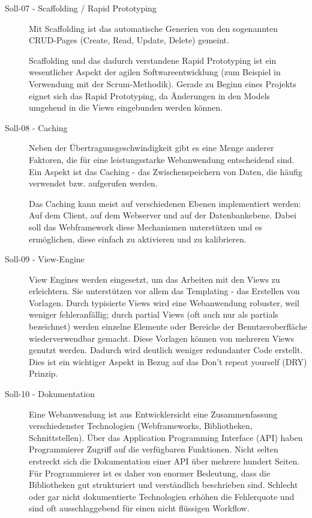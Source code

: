 \begin{description}
    \item[Soll-07 - Scaffolding / Rapid Prototyping\label{itm:Soll-07}]

    Mit Scaffolding ist das automatische Generien von den sogenannten CRUD-Pages
    (Create, Read, Update, Delete) gemeint.

    Scaffolding und das dadurch verstandene Rapid Prototyping ist ein
    wesentlicher Aspekt der agilen Softwareentwicklung (zum Beispiel in
    Verwendung mit der Scrum-Methodik). Gerade zu Beginn eines Projekts eignet
    sich das Rapid Prototyping, da Änderungen in den Models umgehend in die
    Views eingebunden werden können.

    \item[Soll-08 - Caching\label{itm:Soll-08}]

    Neben der Übertragunsgeschwindigkeit gibt es eine Menge anderer Faktoren,
    die für eine leistungsstarke Webanwendung entscheidend sind. Ein Aspekt ist
    das Caching - das Zwischenspeichern von Daten, die häufig verwendet bzw.
    aufgerufen werden.

    Das Caching kann meist auf verschiedenen Ebenen implementiert werden: Auf
    dem Client, auf dem Webserver und auf der Datenbankebene. Dabei soll das
    Webframework diese Mechanismen unterstützen und es ermöglichen, diese
    einfach zu aktivieren und zu kalibrieren.  

    \item[Soll-09 - View-Engine\label{itm:Soll-09}]

    View Engines werden eingesetzt, um das Arbeiten mit den Views zu
    erleichtern. Sie unterstützen vor allem das Templating - das Erstellen von
    Vorlagen. Durch typisierte Views wird eine Webanwendung robuster, weil
    weniger fehleranfällig; durch partial Views (oft auch nur als partials
    bezeichnet) werden einzelne Elemente oder Bereiche der Benutzeroberfläche
    wiederverwendbar gemacht. Diese Vorlagen können von mehreren Views genutzt
    werden. Dadurch wird deutlich weniger redundanter Code erstellt. Dies ist
    ein wichtiger Aspekt in Bezug auf das Don’t repeat yourself (DRY) Prinzip.

    \item[Soll-10 - Dokumentation\label{itm:Soll-10}]

    Eine Webanwendung ist aus Entwicklersicht eine Zusammenfassung
    verschiedenster Technologien (Webframeworks, Bibliotheken, Schnittstellen).
    Über das Application Programming Interface (API) haben Programmierer Zugriff
    auf die verfügbaren Funktionen. Nicht selten erstreckt sich die
    Dokumentation einer API über mehrere hundert Seiten. Für Programmierer ist
    es daher von enormer Bedeutung, dass die Bibliotheken gut strukturiert und
    verständlich beschrieben sind. Schlecht oder gar nicht dokumentierte
    Technologien erhöhen die Fehlerquote und sind oft ausschlaggebend für einen
    nicht flüssigen Workflow.


\end{description}
